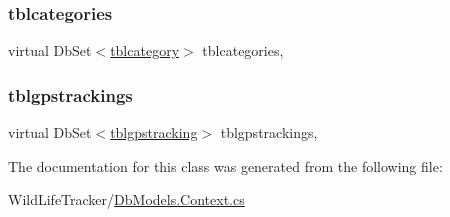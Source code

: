 \subsubsection{\texorpdfstring{tblcategories}{tblcategories}}
{\footnotesize\ttfamily virtual Db\+Set$<$\hyperlink{classWildLifeTracker_1_1tblcategory}{tblcategory}$>$ tblcategories\hspace{0.3cm}{\ttfamily [get]}, {\ttfamily [set]}}

\mbox{\label{classWildLifeTracker_1_1game__reserve__dbEntities_a9b22490ada233f3325165fbd2acebeec}} 
\subsubsection{\texorpdfstring{tblgpstrackings}{tblgpstrackings}}
{\footnotesize\ttfamily virtual Db\+Set$<$\hyperlink{classWildLifeTracker_1_1tblgpstracking}{tblgpstracking}$>$ tblgpstrackings\hspace{0.3cm}{\ttfamily [get]}, {\ttfamily [set]}}



The documentation for this class was generated from the following file\+:\begin{DoxyCompactItemize}
\item 
Wild\+Life\+Tracker/\hyperlink{DbModels_8Context_8cs}{Db\+Models.\+Context.\+cs}\end{DoxyCompactItemize}
